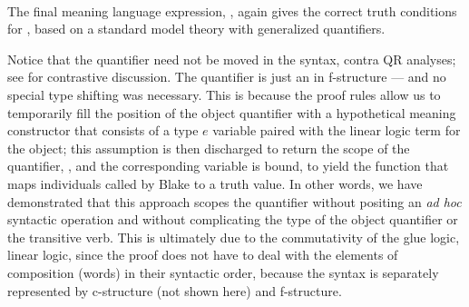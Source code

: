 \begin{exe}
  \ex
  \begin{minipage}[t]{.99\linewidth}
    \medskip\\
\nopagebreak
{}
\end{minipage}
\end{exe}

\noindent
The final meaning language expression,
, again gives the correct truth
  conditions for , based on a standard
  model theory with generalized quantifiers. 
  
  Notice that the
  quantifier need not be moved in the syntax, contra QR analyses; see \citealt{Gotham2018} for contrastive discussion. The quantifier is just an
   in f-structure --- and no special type shifting was
  necessary. This is because the proof rules  allow 
  us to temporarily fill the position of the object quantifier with a
  hypothetical meaning constructor that consists of a type $e$ variable
  paired with the linear logic term for the object; this assumption is
  then discharged to return the scope
  of the quantifier, , and the corresponding
  variable is bound, to yield the function that maps individuals called
  by Blake to a truth value. In other words, we have demonstrated that
  this approach scopes the quantifier without positing an \emph{ad
    hoc} syntactic operation and without complicating the type of the
  object quantifier or the transitive verb. This is ultimately due to
  the commutativity of the glue logic, linear logic, since the proof
  does not have to deal with the elements of composition (words) in
  their syntactic order, because the syntax is separately represented by
  c-structure (not shown here) and f-structure. 

